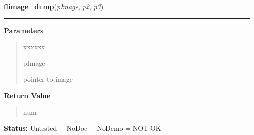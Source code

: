 \hspace{.8\funcindent}\begin{boxedminipage}{\funcwidth}

    \raggedright \textbf{flimage\_dump}(\textit{pImage}, \textit{p2}, \textit{p3})

    \vspace{-1.5ex}

    \rule{\textwidth}{0.5\fboxrule}
\setlength{\parskip}{2ex}
\setlength{\parskip}{1ex}
      \textbf{Parameters}
      \vspace{-1ex}

      \begin{quote}
        \begin{Ventry}{xxxxxx}

          \item[pImage]

          pointer to image

        \end{Ventry}

      \end{quote}

      \textbf{Return Value}
    \vspace{-1ex}

      \begin{quote}
      num

      \end{quote}

\textbf{Status:} Untested + NoDoc + NoDemo = NOT OK



    \end{boxedminipage}

    \label{xformslib:library:flimage_close}

    \vspace{0.5ex}

